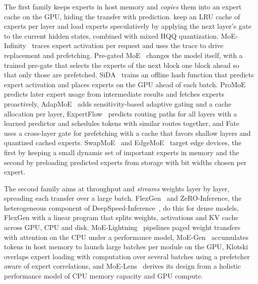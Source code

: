 The first family keeps experts in host memory and \emph{copies} them into an expert cache on the GPU, hiding the
transfer with prediction. \citet{eliseev2023fast} keep an LRU cache of experts per layer and load experts speculatively
by applying the next layer's gate to the current hidden states, combined with mixed HQQ quantization.
MoE-Infinity~\citep{xue2024moeinfinity} traces expert activation per request and uses the trace to drive replacement
and prefetching. Pre-gated MoE~\citep{hwang2024pregated} changes the model itself, with a trained pre-gate that selects
the experts of the next block one block ahead so that only those are prefetched. SiDA~\citep{du2024sida} trains an
offline hash function that predicts expert activation and places experts on the GPU ahead of each batch.
ProMoE~\citep{song2024promoe} predicts later expert usage from intermediate results and fetches experts proactively,
AdapMoE~\citep{zhong2024adapmoe} adds sensitivity-based adaptive gating and a cache allocation per layer,
ExpertFlow~\citep{he2026expertflow} predicts routing paths for all layers with a learned predictor and schedules tokens
with similar routes together, and Fate~\citep{fang2025fate} uses a cross-layer gate for prefetching with a cache that
favors shallow layers and quantized cached experts. SwapMoE~\citep{kong2024swapmoe} and EdgeMoE~\citep{yi2025edgemoe}
target edge devices, the first by keeping a small dynamic set of important experts in memory and the second by
preloading predicted experts from storage with bit widths chosen per expert.

The second family aims at throughput and \emph{streams} weights layer by layer, spreading each transfer over a large
batch. FlexGen~\citep{sheng2023flexgen} and ZeRO-Inference, the heterogeneous component of
DeepSpeed-Inference~\citep{aminabadi2022deepspeedinference}, do this for dense models, FlexGen with a linear program
that splits weights, activations and KV cache across GPU, CPU and disk. MoE-Lightning~\citep{cao2025moelightning}
pipelines paged weight transfers with attention on the CPU under a performance model,
MoE-Gen~\citep{xu2025moegen} accumulates tokens in host memory to launch large batches per module on the GPU,
Klotski~\citep{fang2025klotski} overlaps expert loading with computation over several batches using a prefetcher aware
of expert correlations, and MoE-Lens~\citep{yuan2025moelens} derives its design from a holistic performance model of
CPU memory capacity and GPU compute.

